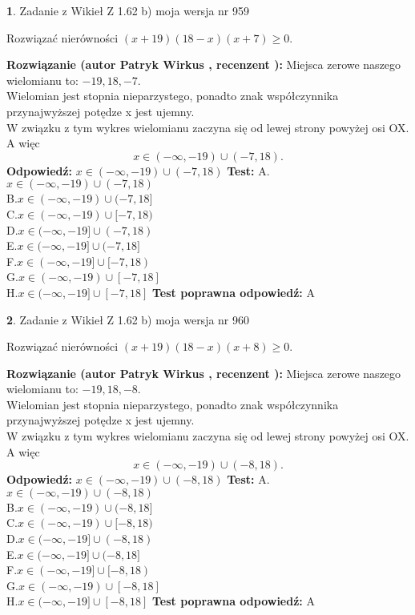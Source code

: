 \documentclass[12pt, a4paper]{article}
\theoremstyle{definition} %
\newtheorem{zad}{}
\newcommand{\zadStart}[1]{\begin{zad}#1\newline}
\newcommand{\zadStop}{\end{zad}}
\newcommand{\rozwStart}[2]{\noindent \textbf{Rozwiązanie (autor #1 , recenzent #2): }\newline}
\newcommand{\rozwStop}{\newline}
\newcommand{\odpStart}{\noindent \textbf{Odpowiedź:}\newline}
\newcommand{\odpStop}{\newline}
\newcommand{\testStart}{\noindent \textbf{Test:}\newline}
\newcommand{\testStop}{\newline}
\newcommand{\kluczStart}{\noindent \textbf{Test poprawna odpowiedź:}\newline}
\newcommand{\kluczStop}{\newline}
\begin{document}
\zadStart{Zadanie z Wikieł Z 1.62 b) moja wersja nr 959}

Rozwiązać nierówności $(x+19)(18-x)(x+7)\ge0$.
\zadStop
\rozwStart{Patryk Wirkus}{}
Miejsca zerowe naszego wielomianu to: $-19, 18, -7$.\\
Wielomian jest stopnia nieparzystego, ponadto znak współczynnika przy\linebreak najwyższej potędze x jest ujemny.\\ W związku z tym wykres wielomianu zaczyna się od lewej strony powyżej osi OX. A więc $$x \in (-\infty,-19) \cup (-7,18).$$
\rozwStop
\odpStart
$x \in (-\infty,-19) \cup (-7,18)$
\odpStop
\testStart
A.$x \in (-\infty,-19) \cup (-7,18)$\\
B.$x \in (-\infty,-19) \cup (-7,18]$\\
C.$x \in (-\infty,-19) \cup [-7,18)$\\
D.$x \in (-\infty,-19] \cup (-7,18)$\\
E.$x \in (-\infty,-19] \cup (-7,18]$\\
F.$x \in (-\infty,-19] \cup [-7,18)$\\
G.$x \in (-\infty,-19) \cup [-7,18]$\\
H.$x \in (-\infty,-19] \cup [-7,18]$
\testStop
\kluczStart
A
\kluczStop



\zadStart{Zadanie z Wikieł Z 1.62 b) moja wersja nr 960}

Rozwiązać nierówności $(x+19)(18-x)(x+8)\ge0$.
\zadStop
\rozwStart{Patryk Wirkus}{}
Miejsca zerowe naszego wielomianu to: $-19, 18, -8$.\\
Wielomian jest stopnia nieparzystego, ponadto znak współczynnika przy\linebreak najwyższej potędze x jest ujemny.\\ W związku z tym wykres wielomianu zaczyna się od lewej strony powyżej osi OX. A więc $$x \in (-\infty,-19) \cup (-8,18).$$
\rozwStop
\odpStart
$x \in (-\infty,-19) \cup (-8,18)$
\odpStop
\testStart
A.$x \in (-\infty,-19) \cup (-8,18)$\\
B.$x \in (-\infty,-19) \cup (-8,18]$\\
C.$x \in (-\infty,-19) \cup [-8,18)$\\
D.$x \in (-\infty,-19] \cup (-8,18)$\\
E.$x \in (-\infty,-19] \cup (-8,18]$\\
F.$x \in (-\infty,-19] \cup [-8,18)$\\
G.$x \in (-\infty,-19) \cup [-8,18]$\\
H.$x \in (-\infty,-19] \cup [-8,18]$
\testStop
\kluczStart
A
\kluczStop
\end{document}
